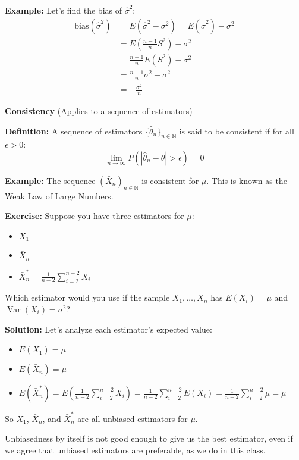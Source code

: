 \documentclass{article}
\begin{document}
   \textbf{Example:} Let's find the bias of $\hat{\sigma}^2$:
   \begin{align*}
       \text{bias}(\hat{\sigma}^2) &= E(\hat{\sigma}^2 - \sigma^2) = E(\hat{\sigma}^2) - \sigma^2 \\
       &= E(\frac{n-1}{n}S^2) - \sigma^2 \\
       &= \frac{n-1}{n}E(S^2) - \sigma^2 \\
       &= \frac{n-1}{n}\sigma^2 - \sigma^2 \\
       &= -\frac{\sigma^2}{n}
   \end{align*}

   \textbf{Consistency} (Applies to a sequence of estimators)

   \textbf{Definition:} A sequence of estimators $\{\hat{\theta}_n\}_{n \in \mathbb{N}}$ is said to be consistent if for all $\epsilon > 0$:
   \[\lim_{n \to \infty} P(|\hat{\theta}_n - \theta| > \epsilon) = 0\]

   \textbf{Example:} The sequence $(\bar{X}_n)_{n\in\mathbb{N}}$ is consistent for $\mu$. This is known as the Weak Law of Large Numbers.

   \textbf{Exercise:} Suppose you have three estimators for $\mu$:
   \begin{itemize}
       \item $X_1$ 
       \item $\bar{X}_n$ 
       \item $\bar{X}^*_n = \frac{1}{n-2} \sum_{i=2}^{n-2} X_i$ 
   \end{itemize}
   Which estimator would you use if the sample $X_1, \ldots, X_n$ has $E(X_i) = \mu$ and $\operatorname{Var}(X_i) = \sigma^2$?

   \textbf{Solution:}
   Let's analyze each estimator's expected value:

   \begin{itemize}
       \item $E(X_1) = \mu$
       \item $E(\bar{X}_n) = \mu$
       \item $E(\bar{X}^*_n) = E\left(\frac{1}{n-2}\sum_{i=2}^{n-2} X_i\right) 
           = \frac{1}{n-2} \sum_{i=2}^{n-2} E(X_i) 
           = \frac{1}{n-2} \sum_{i=2}^{n-2} \mu 
           = \mu$
   \end{itemize}

   So $X_1$, $\bar{X}_n$, and $\bar{X}^*_n$ are all unbiased estimators for $\mu$.

   Unbiasedness by itself is not good enough to give us the best estimator, even if we agree that unbiased estimators are preferable, as we do in this class.
\end{document}

